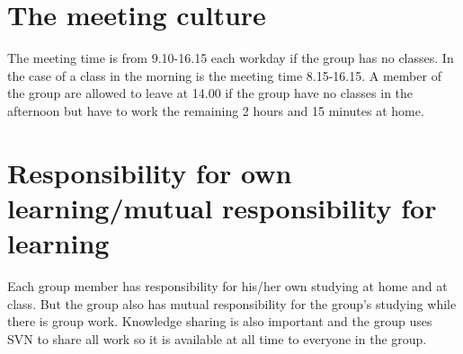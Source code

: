 \section{The meeting culture}
The meeting time is from 9.10-16.15 each workday if the group has no classes. In the case of a class in the morning is the meeting time 8.15-16.15.
A member of the group are allowed to leave at 14.00 if the group have no classes in the afternoon but have to work the remaining 2 hours and 15 minutes at home.
\section{Responsibility for own learning/mutual responsibility for learning}
Each group member has responsibility for his/her own studying at home and at class. But the group also has mutual responsibility for the group's studying while there is group work. 
Knowledge sharing is also important and the group uses SVN to share all work so it is available at all time to everyone in the group.